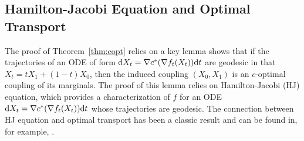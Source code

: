 \subsection{Hamilton-Jacobi Equation and Optimal Transport}
\label{sec:hj}
The proof of Theorem~\ref{thm:copt} relies on a 
key lemma shows that if the trajectories of an ODE of form $\mathrm{d} X_t = \nabla c^*(\nabla f_t(X_t))\mathrm{d}t $ are geodesic in that $X_t = tX_1+(1-t) X_0$, 
then the induced coupling $(X_0,X_1)$ is an $c$-optimal coupling of its marginals. 
The proof of this lemma relies on 
Hamilton-Jacobi (HJ) equation, which provides 
a characterization of $f$ 
for an ODE $\mathrm{d} X_t = \nabla c^*(\nabla f_t(X_t))\mathrm{d}t $ whose trajectories are geodesic. 
The connection between HJ equation and optimal transport has been a classic result and 
can be found in, for example, \cite{villani2021topics,villani2009optimal}. 


